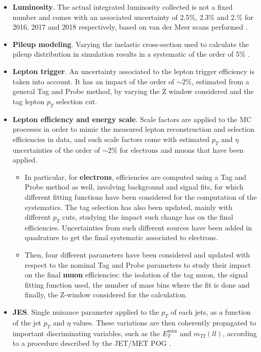 \documentclass[a4paper, 10pt, openright]{report}
\begin{document}
\begin{itemize}
\item \textbf{Luminosity}. The actual integrated luminosity collected is not a fixed number and comes with an associated uncertainty of 2.5\%, 2.3\% and 2.\% for 2016, 2017 and 2018 respectively, based on van der Meer scans performed \cite{Lumi2016, Lumi2017, Lumi2018}.
\item \textbf{Pileup modeling}. Varying the inelastic cross-section used to calculate the pileup distribution in simulation results in a systematic of the order of 5\% \cite{PUmodel}.
\item \textbf{Lepton trigger}. An uncertainty associated to the lepton trigger efficiency is taken into account. It has an impact of the order of $\sim 2$\%, estimated from a general Tag and Probe method, by varying the Z window considered and the tag lepton $p_T$ selection cut. 
\item \textbf{Lepton efficiency and energy scale}. Scale factors are applied to the \ac{MC} processes in order to mimic the measured lepton reconstruction and selection efficiencies in data, and such scale factors come with estimated $p_T$ and $\eta$ uncertainties of the order of $\sim2$\% for electrons and muons that have been applied.  
\begin{itemize}
\item In particular, for \textbf{electrons}, efficiencies are computed using a Tag and Probe method as well, involving background and signal fits, for which different fitting functions have been considered for the computation of the systematics. The tag selection has also been updated, mainly with different $p_T$ cuts, studying the impact such change has on the final efficiencies. Uncertainties from such different sources have been added in quadrature to get the final systematic associated to electrons.
\item Then, four different parameters have been considered and updated with respect to the nominal Tag and Probe parameters to study their impact on the final \textbf{muon} efficiencies: the isolation of the tag muon, the signal fitting function used, the number of mass bins where the fit is done and finally, the Z-window considered for the calculation. 
\end{itemize}
\item \textbf{\ac{JES}}. Single nuisance parameter applied to the $p_T$ of each jets, as a function of the jet $p_T$ and $\eta$ values. These variations are then coherently propagated to important discriminating variables, such as the $E_T^\text{miss}$ and $m_{T2}(ll)$, according to a procedure described by the JET/MET \ac{POG} \cite{JETMETPOG}.

\end{itemize}
\end{document}
